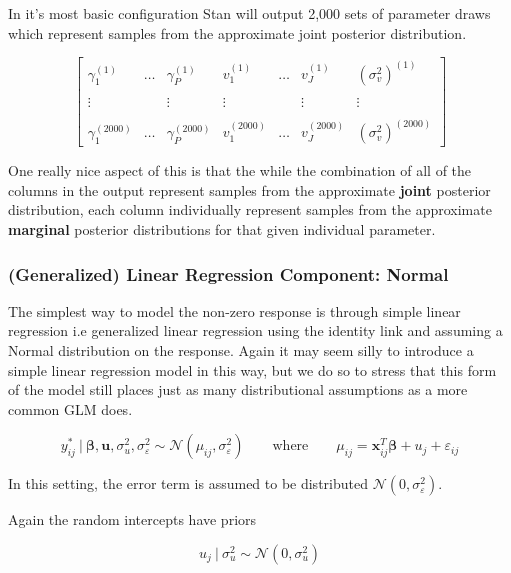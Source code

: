 \documentclass[12pt,twoside]{reedthesis}
\begin{document}
In it's most basic configuration Stan will output 2,000 sets of parameter draws which represent samples from the approximate joint posterior distribution.

\[
\begin{bmatrix}
  \gamma_1^{(1)} & \dots & \gamma_P^{(1)} & v_1^{(1)} & \dots & v_J^{(1)}  & (\sigma_{v}^2)^{(1)} \\
  \\ \vdots   &  & \vdots  & \vdots & &  \vdots & \vdots  \\ \\
  \gamma_1^{(2000)} & \dots &\gamma_P^{(2000)} & v_1^{(2000)}& \dots & v_J^{(2000)} & (\sigma_{v}^2)^{(2000)}
\end{bmatrix}
\]

One really nice aspect of this is that the while the combination of all of the columns in the output represent samples from the approximate \textbf{joint} posterior distribution, each column individually represent samples from the approximate \textbf{marginal} posterior distributions for that given individual parameter.

\hypertarget{generalized-linear-regression-component-normal}{%
\subsubsection{(Generalized) Linear Regression Component: Normal}\label{generalized-linear-regression-component-normal}}

The simplest way to model the non-zero response is through simple linear regression i.e generalized linear regression using the identity link and assuming a Normal distribution on the response. Again it may seem silly to introduce a simple linear regression model in this way, but we do so to stress that this form of the model still places just as many distributional assumptions as a more common GLM does.

\[
y^*_{ij} \ | \ \boldsymbol{\beta}, \boldsymbol{u}, \sigma_{u}^2,  \sigma_{\varepsilon}^2 \sim \mathcal{N}(\mu_{ij}, \sigma_{\varepsilon}^2) \qquad \text{where} \qquad \mu_{ij} = \mathbf{x}_{ij}^T\boldsymbol{\beta} + u_j + \varepsilon_{ij}
\]

In this setting, the error term is assumed to be distributed \(\mathcal{N}(0, \sigma_{\varepsilon}^2)\).

Again the random intercepts have priors

\[
u_j \ | \ \sigma_{u}^2 \sim \mathcal{N}(0, \sigma_{u}^2)
\]
\end{document}
